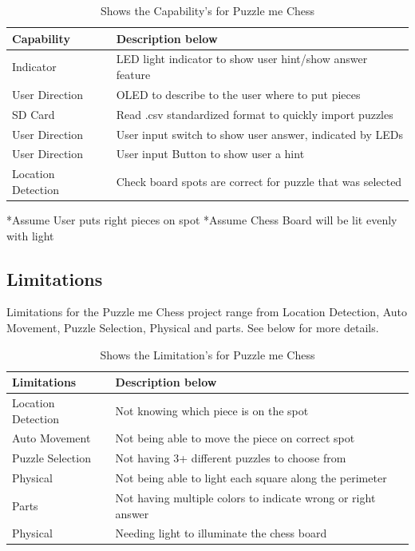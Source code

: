 \documentclass[11pt]{article}
\begin{document}
\begin{table}
\begin{center}
    \begin{tabular}{| l | l |}
    \hline
    Capability  & Description below\\ \hline
    Indicator &  LED light indicator to show user hint/show answer feature \\ \hline
    User Direction & OLED to describe to the user where to put pieces \\ \hline 
    SD Card & Read .csv standardized format to quickly import puzzles \\ \hline
    User Direction & User input switch to show user answer, indicated by LEDs \\ \hline
    User Direction & User input Button to show user a hint \\ \hline
    Location Detection & Check board spots are correct for puzzle that was selected \\ \hline
    \end{tabular}
    \caption{Shows the Capability's for Puzzle me Chess}
	\label{tab:capability}
\end{center}
\end{table}
 *Assume User puts right pieces on spot 
 \newline
 *Assume Chess Board will be lit evenly with light  
\subsection{Limitations}
Limitations for the Puzzle me Chess project range from Location Detection, Auto Movement, Puzzle Selection, Physical and parts. See below for more details.

\begin{table}
\begin{center}
    \begin{tabular}{| l | l |}
    \hline
    Limitations  & Description below\\ \hline
    Location Detection & Not knowing which piece is on the spot \\ \hline
    Auto Movement & Not being able to move the piece on correct spot \\ \hline 
    Puzzle Selection & Not having 3+ different puzzles to choose from  \\ \hline
    Physical & Not being able to light each square along the perimeter  \\ \hline
    Parts & Not having multiple colors to indicate wrong or right answer \\ \hline
    Physical & Needing light to illuminate  the chess board \\ \hline
    \end{tabular}
    \caption{Shows the Limitation's for Puzzle me Chess}
	\label{tab:limitations}
\end{center}
\end{table}
\end{document}

